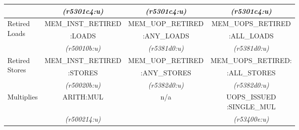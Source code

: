\begin{tabular}{|l||c|c|c|}
			&
{\em (r5301c4:u)}	& %
{\em (r5301c4:u)}	& %
{\em (r5301c4:u)}	\\ %


\hline
\multirow{3}{*}{\parbox{0.5in}{Retired \\Loads}}   &  
MEM\_INST\_RETIRED                                 & %
MEM\_UOP\_RETIRED                                  & %
MEM\_UOPS\_RETIRED        \\ %

                         &
:LOADS                   & %
:ANY\_LOADS              & %
:ALL\_LOADS              \\ %


                         &
{\em (r50010b:u)}        & %
{\em (r5381d0:u)}        & %
{\em (r5381d0:u)}	\\ %


\hline
\multirow{3}{*}{\parbox{0.5in}{Retired \\Stores}}              &  
MEM\_INST\_RETIRED        & %
MEM\_UOP\_RETIRED         & %
MEM\_UOPS\_RETIRED:       \\ %

                          &
:STORES                   & %
:ANY\_STORES              & %
:ALL\_STORES              \\ %


                          &
{\em (r50020b:u)}         & %
{\em (r5382d0:u)}         & %
{\em (r5382d0:u)}         \\ %


\hline
\multirow{3}{*}{\parbox{0.5in}{Multiplies}}                 &  
\multirow{2}{*}{ARITH:MUL}             & %
\multirow{3}{*}{n/a}                   & %
\multirow{2}{*}{\parbox{1in}{\centering UOPS\_ISSUED\\
:SINGLE\_MUL}}             \\ %


			&
			&  %
			&  %
			\\ %


                      &
{\em (r500214:u)}     & %
                      & %
{\em (r53400e:u)}     \\ %




\end{tabular}
